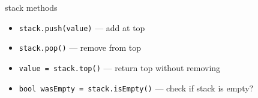 \begin{frame}[fragile,label=stackOps]{stack methods}
\lstset{
    language=C++,
    style=small
}
\begin{itemize}
\item \lstinline|stack.push(value)| --- add at top
\item \lstinline|stack.pop()| --- remove from top
\item \lstinline|value = stack.top()| --- return top without removing
\item \lstinline|bool wasEmpty = stack.isEmpty()| --- check if stack is empty?
\end{itemize}
\end{frame}
